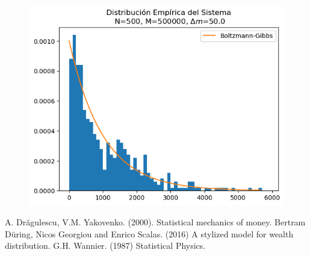 \documentclass[10pt]{article}
\theoremstyle{plain}
\theoremstyle{definition}
\begin{document}
\begin{figure}[h!]
\centering
\includegraphics[width=0.4\linewidth]{img/ejSimulacion.png}
\caption{}
\end{figure}



\newpage
\begin{thebibliography}{}
     A. Dr\u{a}gulescu, V.M. Yakovenko. (2000). Statistical mechanics of money.
     Bertram Düring, Nicos Georgiou and Enrico Scalas. (2016) A stylized model for wealth distribution. 
     G.H. Wannier. (1987) Statistical Physics.
\end{thebibliography}
\end{document}
